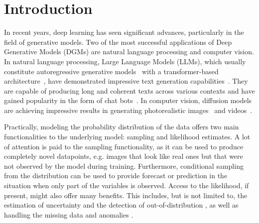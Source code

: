 \chapter{Introduction}\label{chap:intro}



In recent years, deep learning has seen significant advances, particularly in the field of generative models. Two of the most successful applications of Deep Generative Models (DGMs) are natural language processing and computer vision. In natural language processing, Large Language Models (LLMs), which usually constitute autoregressive generative models~\citep{graves2013generating} with a transformer-based architecture~\citep{vaswani2017attention}, have demonstrated impressive text generation capabilities~\citep{brown2020language,chowdhery2023palm}. They are capable of producing long and coherent texts across various contexts and have gained popularity in the form of chat bots~\citep{achiam2023gpt}. In computer vision, diffusion models are achieving impressive results in generating photorealistic images~\citep{dhariwal2021diffusion} and videos~\citep{ho2022video}.


Practically, modeling the probability distribution of the data offers two main functionalities to the underlying model: sampling and likelihood estimates. A lot of attention is paid to the sampling functionality, as it can be used to produce completely novel datapoints, e.g. images that look like real ones but that were not observed by the model during training. Furthermore, conditional sampling from the distribution can be used to provide forecast or prediction in the situation when only part of the variables is observed. Access to the likelihood, if present, might also offer many benefits. This includes, but is not limited to, the estimation of uncertainty and the detection of out-of-distribution \cite{havtorn2021hierarchical, kadavath2022language}, as well as handling the missing data \cite{mattei2019miwae} and anomalies \citep{an2015variational}.

